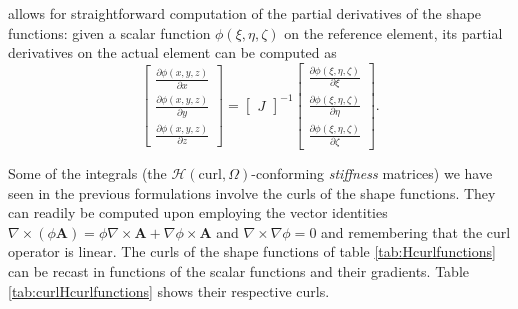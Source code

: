\noindent allows for straightforward computation of the partial derivatives of the shape functions: given a scalar function $\phi(\xi, \eta, \zeta)$ on the reference element, its partial derivatives on the actual element can be computed as
\begin{equation}
\label{eq:gradients}
\begin{bmatrix}
\frac{\partial \phi(x, y, z)}{\partial x} \\
\frac{\partial \phi(x, y, z)}{\partial y} \\
\frac{\partial \phi(x, y, z)}{\partial z} 
\end{bmatrix}
=
\begin{bmatrix}
J
\end{bmatrix}^{-1}
\begin{bmatrix}
\frac{\partial \phi(\xi, \eta, \zeta)}{\partial \xi} \\
\frac{\partial \phi(\xi, \eta, \zeta)}{\partial \eta} \\
\frac{\partial \phi(\xi, \eta, \zeta)}{\partial \zeta} 
\end{bmatrix}.
\end{equation}

\noindent Some of the integrals (the $\mathcal{H}(\mathrm{curl},\Omega)$-conforming \textit{stiffness} matrices) we have seen in the previous formulations involve the curls of the shape functions. They can readily be computed upon employing the vector identities $\nabla \times \left( \phi \mathbf{A} \right) = \phi \nabla \times \mathbf{A} + \nabla \phi \times \mathbf{A}$ and $\nabla \times \nabla \phi = 0$ and remembering that the curl operator is linear. The curls of the shape functions of table \ref{tab:Hcurlfunctions} can be recast in functions of the scalar functions and their gradients. Table \ref{tab:curlHcurlfunctions} shows their respective curls.

